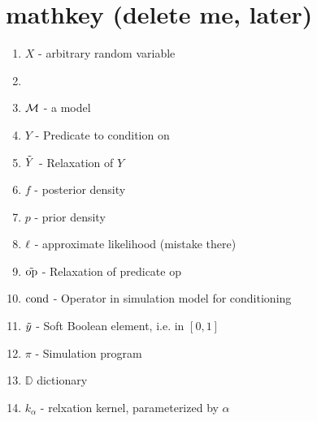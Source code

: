 \section{mathkey (delete me, later)}

\begin{enumerate}
\item $X$ - arbitrary random variable
\item \item ${\mathcal{M}}$ - a model
\item $Y$ - Predicate to condition on
\item $\mathrel{\tilde{Y}}$ - Relaxation of $Y$ 
\item $f$ - posterior density
\item $p$ - prior density
\item $\operatorname{\ell}$ - approximate likelihood (mistake there)
\item $\mathrel{\tilde{\textrm{op}}}$ - Relaxation of predicate $\textrm{op}$
\item $\operatorname{cond}$ - Operator in simulation model for conditioning
\item $\mathrel{\tilde{y}}$ - Soft Boolean element, i.e. in $[0, 1]$
\item $\pi$ - Simulation program
\item $\mathbb{D}$ dictionary
\item $k_\alpha$ - relxation kernel, parameterized by $\alpha$
\end{enumerate}